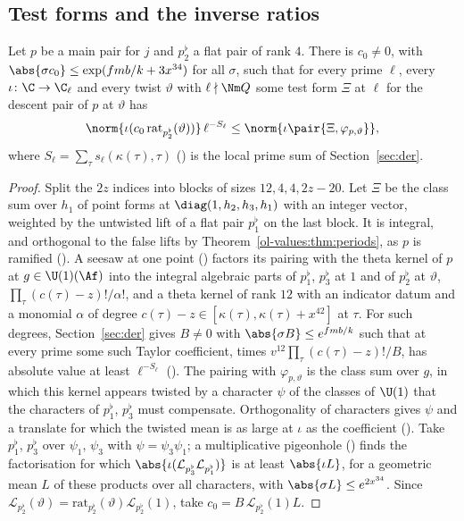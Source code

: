 \subsection{Test forms and the inverse ratios}

\begin{proposition}\label{ol-values:prop:test}
Let $p$ be a main pair for $j$ and $p^\flat_2$ a flat pair of rank $4$. There is $c_0\ne0$, with
$\abs{\sigma c_0}\le\exp(fmb/k+3x^{34})$ for all $\sigma$, such that for every prime $\ell$, every
$\iota\colon\C\to\C_\ell$ and every twist $\vartheta$ with $\ell\nmid\Nm Q$ some test form $\Xi$ at
$\ell$ for the descent pair of $p$ at $\vartheta$ has
\[
\norm{\iota(c_0\,\mathrm{rat}_{p^\flat_2}(\vartheta))}\,\ell^{-S_\ell}\le
\norm{\iota\pair{\Xi,\varphi_{p,\vartheta}}},
\]
where $S_\ell=\sum_\tau s_\ell(\kappa(\tau),\tau)$ () is the
local prime sum of Section~\ref{sec:der}.
\end{proposition}

\begin{proof}
Split the $2z$ indices into blocks of sizes $12,4,4,2z-20$. Let $\Xi$ be the class sum over $h_1$
of point forms at $\diag(1,h_2,h_3,h_1)$ with an integer vector, weighted by the untwisted lift of a
flat pair $p^\flat_1$ on the last block. It is integral, and orthogonal to the false lifts by
Theorem~\ref{ol-values:thm:periods}, as $p$ is ramified
(). A seesaw at one point
() factors its pairing with the theta kernel of $p$ at
$g\in\U(1)(\Af)$ into the integral algebraic parts of $p^\flat_1$, $p^\flat_3$ at $1$ and of $p^\flat_2$ at
$\vartheta$, $\prod_\tau(c(\tau)-z)!/\alpha!$, and a theta kernel of rank $12$ with an indicator
datum and a monomial $\alpha$ of degree $c(\tau)-z\in[\kappa(\tau),\kappa(\tau)+x^{42}]$ at $\tau$. For such degrees, Section~\ref{sec:der} gives $B\ne0$ with $\abs{\sigma B}\le e^{fmb/k}$
such that at every prime some such Taylor coefficient, times $v^{12}\prod_\tau(c(\tau)-z)!/B$, has
absolute value at least $\ell^{-S_\ell}$ ().
The pairing with $\varphi_{p,\vartheta}$ is the class sum over $g$, in which this kernel appears
twisted by a character $\psi$ of the classes of $\U(1)$ that the characters of $p^\flat_1$, $p^\flat_3$ must
compensate. Orthogonality of characters gives $\psi$ and a translate for which the twisted mean is
as large at $\iota$ as the coefficient (). Take
$p^\flat_1$, $p^\flat_3$ over $\psi_1$, $\psi_3$ with $\psi=\psi_3\psi_1$; a multiplicative pigeonhole
() finds the factorisation for which
$\abs{\iota(\mathcal L_{p^\flat_3}\mathcal L_{p^\flat_1})}$ is at least $\abs{\iota L}$, for a geometric mean $L$
of these products over all characters, with $\abs{\sigma L}\le e^{2x^{34}}$. Since
$\mathcal L_{p^\flat_2}(\vartheta)=\mathrm{rat}_{p^\flat_2}(\vartheta)\mathcal L_{p^\flat_2}(1)$, take
$c_0=B\,\mathcal L_{p^\flat_2}(1)L$.
\end{proof}


